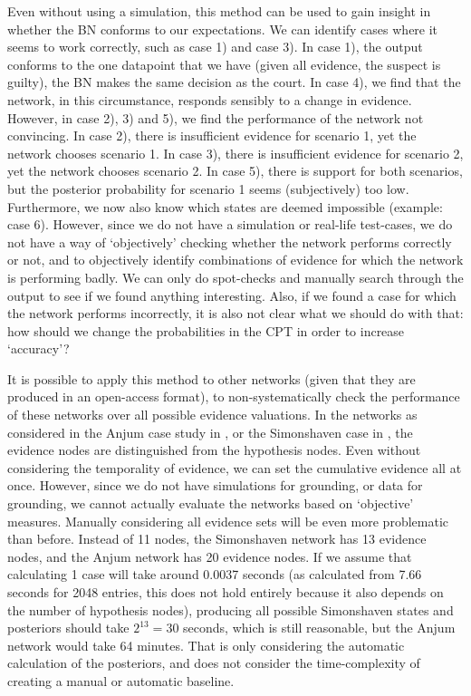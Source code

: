 \documentclass[12pt]{article}
\begin{document}
Even without using a simulation, this method can be used to gain insight in whether the BN conforms to our expectations. We can identify cases where it seems to work correctly, such as case 1) and case 3). In case 1), the output conforms to the one datapoint that we have (given all evidence, the suspect is guilty), the BN makes the same decision as the court. In case 4), we find that the network, in this circumstance, responds sensibly to a change in evidence. However, in case 2), 3) and 5), we find the performance of the network not convincing. In case 2), there is insufficient evidence for scenario 1, yet the network chooses scenario 1. In case 3), there is insufficient evidence for scenario 2, yet the network chooses scenario 2. In case 5), there is support for both scenarios, but the posterior probability for scenario 1 seems (subjectively) too low. Furthermore, we now also know which states are deemed impossible (example: case 6). However, since we do not have a simulation or real-life test-cases, we do not have a way of `objectively' checking whether the network performs correctly or not, and to objectively identify combinations of evidence for which the network is performing badly. We can only do spot-checks and manually search through the output to see if we found anything interesting. Also, if we found a case for which the network performs incorrectly, it is also not clear what we should do with that: how should we change the probabilities in the CPT in order to increase `accuracy'?

It is possible to apply this method to other networks (given that they are produced in an open-access format), to non-systematically check the performance of these networks over all possible evidence valuations. In the networks as considered in the Anjum case study in \citet{vlek2016}, or the Simonshaven case in \citet{Fenton2019}, the evidence nodes are distinguished from the hypothesis nodes. Even without considering the temporality of evidence, we can set the cumulative evidence all at once. However, since we do not have simulations for grounding, or data for grounding, we cannot actually evaluate the networks based on `objective' measures. Manually considering all evidence sets will be even more problematic than before. Instead of 11 nodes, the Simonshaven network has 13 evidence nodes, and the Anjum network has 20 evidence nodes. If we assume that calculating 1 case will take around 0.0037 seconds (as calculated from 7.66 seconds for 2048 entries, this does not hold entirely because it also depends on the number of hypothesis nodes), producing all possible Simonshaven states and posteriors should take $2^{13} = 30$ seconds, which is still reasonable, but the Anjum network would take 64 minutes. That is only considering the automatic calculation of the posteriors, and does not consider the time-complexity of creating a manual or automatic baseline. 
\end{document}
